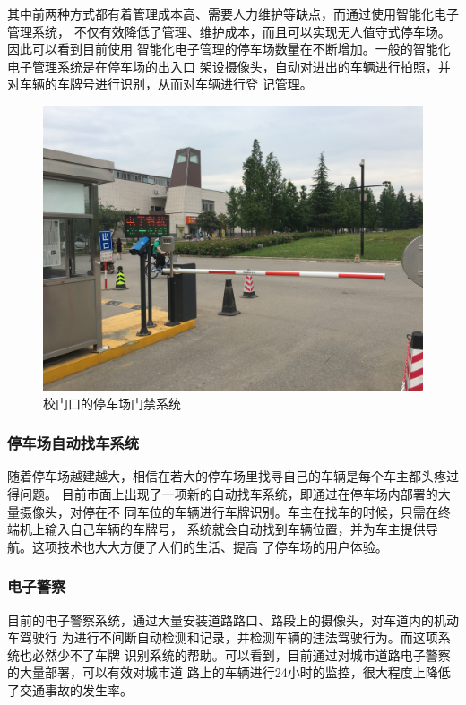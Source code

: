 其中前两种方式都有着管理成本高、需要人力维护等缺点，而通过使用智能化电子管理系统，
不仅有效降低了管理、维护成本，而且可以实现无人值守式停车场。因此可以看到目前使用
智能化电子管理的停车场数量在不断增加。一般的智能化电子管理系统是在停车场的出入口
架设摄像头，自动对进出的车辆进行拍照，并对车辆的车牌号进行识别，从而对车辆进行登
记管理。

\begin{figure}[ht]
  \centering
  \includegraphics[width=0.8\linewidth]{./Figure/ParkingSystem.jpg}
  \caption{校门口的停车场门禁系统}
\end{figure}

\subsubsection{停车场自动找车系统}

随着停车场越建越大，相信在若大的停车场里找寻自己的车辆是每个车主都头疼过得问题。
目前市面上出现了一项新的自动找车系统，即通过在停车场内部署的大量摄像头，对停在不
同车位的车辆进行车牌识别。车主在找车的时候，只需在终端机上输入自己车辆的车牌号，
系统就会自动找到车辆位置，并为车主提供导航。这项技术也大大方便了人们的生活、提高
了停车场的用户体验。

\subsubsection{电子警察}

目前的电子警察系统，通过大量安装道路路口、路段上的摄像头，对车道内的机动车驾驶行
为进行不间断自动检测和记录，并检测车辆的违法驾驶行为。而这项系统也必然少不了车牌
识别系统的帮助。可以看到，目前通过对城市道路电子警察的大量部署，可以有效对城市道
路上的车辆进行24小时的监控，很大程度上降低了交通事故的发生率。

